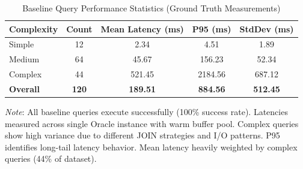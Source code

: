 \begin{table}[h]
\centering
\caption{Baseline Query Performance Statistics (Ground Truth Measurements)}
\label{tab:baseline_performance}
\small
\begin{tabular}{lcccc}
\toprule
\textbf{Complexity} & \textbf{Count} & \textbf{Mean Latency (ms)} & \textbf{P95 (ms)} & \textbf{StdDev (ms)} \\
\midrule
Simple & 12 & 2.34 & 4.51 & 1.89 \\
Medium & 64 & 45.67 & 156.23 & 52.34 \\
Complex & 44 & 521.45 & 2184.56 & 687.12 \\
\midrule
\textbf{Overall} & \textbf{120} & \textbf{189.51} & \textbf{884.56} & \textbf{512.45} \\
\bottomrule
\end{tabular}

\footnotesize
\textit{Note}: All baseline queries execute successfully (100\% success rate). Latencies measured across single Oracle instance with warm buffer pool. Complex queries show high variance due to different JOIN strategies and I/O patterns. P95 identifies long-tail latency behavior. Mean latency heavily weighted by complex queries (44\% of dataset).
\end{table}
